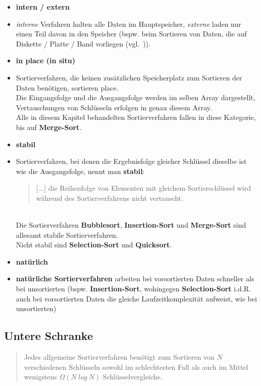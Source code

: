 \begin{itemize}
    \item \textbf{intern / extern}
    \item[] \textit{interne} Verfahren halten alle Daten im Hauptspeicher, \textit{externe} laden nur einen Teil davon in den Speicher (bspw. beim Sortieren von Daten, die auf Diskette / Platte / Band vorliegen (vgl.~\cite[80]{OW17b})).
    \item \textbf{in place (in situ)}
    \item [] Sortierverfahren, die keinen zusätzlichen Speicherplatz zum Sortieren der Daten benötigen, sortieren \textbfin place.\\
    Die Eingangsfolge und die Ausgangsfolge werden im selben Array dargestellt, Vertauschungen von Schlüsseln erfolgen in genau diesem Array.\\
    Alle in diesem Kapitel behandelten Sortierverfahren fallen in diese Kategorie, bis auf \textbf{Merge-Sort}.
    \item \textbf{stabil}
    \item[] Sortierverfahren, bei denen die Ergebnisfolge gleicher Schlüssel dieselbe ist wie die Ausgangsfolge, nennt man \textbf{stabil}:\blockquote[{\cite[164]{OW17b}}]{
        [...] die Reihenfolge von Elementen mit gleichem Sortierschlüssel wird während des Sortierverfahrens nicht vertauscht.
    }.\\
    Die Sortierverfahren \textbf{Bubblesort}, \textbf{Insertion-Sort} und \textbf{Merge-Sort} sind allesamt stabile Sortierverfahren.\\
    Nicht stabil sind \textbf{Selection-Sort} und \textbf{Quicksort}.
    \item \textbf{natürlich}
    \item[] \textbf{natürliche Sortierverfahren} arbeiten bei vorsortierten Daten schneller als bei unsortierten (bspw. \textbf{Insertion-Sort}, wohingegen \textbf{Selection-Sort} i.d.R. auch bei vorsortierten Daten die gleiche Laufzeitkomplexität aufweist, wie bei unsortierten)
\end{itemize}


\subsection{Untere Schranke}

\blockquote[{\cite[154, Satz 2.4]{OW17b}}]{
    Jedes allgemeine Sortierverfahren benötigt zum Sortieren von $N$ verschiedenen Schlüsseln sowohl im schlechtesten Fall als auch im Mittel wenigstens $\Omega(N\ log\ N)$ Schlüsselvergleiche.
}.


